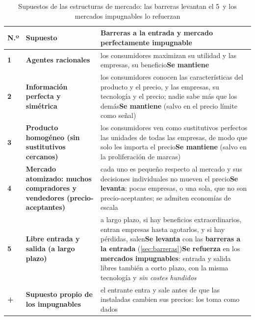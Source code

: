 \documentclass[11pt]{article}
\begin{document}
\begin{table}[H]
\centering
\caption{Supuestos de las estructuras de mercado: las barreras levantan el 5~y los mercados impugnables lo refuerzan}\label{tab:supuestos-impugnables}
\begin{tabular}{>{\centering\arraybackslash}m{0.7cm}>{\raggedright\arraybackslash}m{4.3cm}>{\raggedright\arraybackslash}m{10.0cm}}
\toprule
\rowcolor{tceeazulpalido}\textbf{N.º} & \textbf{Supuesto} & \textbf{Barreras a la entrada y mercado perfectamente impugnable}\\
\midrule
\textcolor{tceemorado}{\textbf{1}} & \textbf{Agentes racionales} & los consumidores maximizan su utilidad y las empresas, su beneficio\newline \textcolor{tceeverde}{\textbf{Se mantiene}}\\
\addlinespace[0.3em]
\textcolor{tceemorado}{\textbf{2}} & \textbf{Información perfecta y simétrica} & los consumidores conocen las características del producto y el precio, y las empresas, su tecnología y el precio; nadie sabe más que los demás\newline \textcolor{tceeverde}{\textbf{Se mantiene}} (salvo en el precio límite como señal)\\
\addlinespace[0.3em]
\textcolor{tceemorado}{\textbf{3}} & \textbf{Producto homogéneo (sin sustitutivos cercanos)} & los consumidores ven como sustitutivos perfectos las unidades de todas las empresas, de modo que solo les importa el precio\newline \textcolor{tceeverde}{\textbf{Se mantiene}} (salvo en la proliferación de marcas)\\
\addlinespace[0.3em]
\rowcolor{tceesalmon}\textcolor{tceemorado}{\textbf{4}} & \textbf{Mercado atomizado: muchos compradores y vendedores (precio-aceptantes)} & cada uno es pequeño respecto al mercado y sus decisiones individuales no mueven el precio\newline \textcolor{tceerojo}{\textbf{Se levanta}}: pocas empresas, o una sola, que no son precio-aceptantes; se admiten economías de escala\\
\addlinespace[0.3em]
\rowcolor{tceesalmon}\textcolor{tceemorado}{\textbf{5}} & \textbf{Libre entrada y salida (a largo plazo)} & a largo plazo, si hay beneficios extraordinarios, entran empresas hasta agotarlos, y si hay pérdidas, salen\newline \textcolor{tceerojo}{\textbf{Se levanta}} con las \textbf{barreras a la entrada} (\ref{sec:barreras})\newline \textcolor{tceeverde}{\textbf{Se refuerza}} en los \textbf{mercados impugnables}: entrada y salida libres también a corto plazo, con la misma tecnología y \emph{sin costes hundidos}\\
\addlinespace[0.3em]
\textcolor{tceedorado}{\textbf{+}} & \textbf{Supuesto propio de los impugnables} & el entrante entra y sale antes de que las instaladas cambien sus precios: los toma como dados\\
\bottomrule
\end{tabular}
\end{table}
\end{document}
